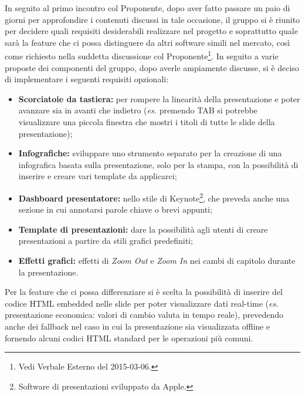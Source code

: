In seguito al primo incontro col Proponente, dopo aver fatto passare un paio di giorni per approfondire i contenuti discussi in tale occasione, il gruppo si è riunito per decidere quali requisiti desiderabili realizzare nel progetto \PROGETTO{} e soprattutto quale sarà la feature che ci possa distinguere da altri software simili nel mercato, così come richiesto nella suddetta discussione col Proponente\footnote{Vedi Verbale Esterno del 2015-03-06.}.
In seguito a varie proposte dei componenti del gruppo, dopo averle ampiamente discusse, si è deciso di implementare i seguenti requisiti opzionali:
\begin{itemize}
	\item \textbf{Scorciatoie da tastiera:} per rompere la linearità della presentazione e poter avanzare sia in avanti che indietro (\textit{es.} premendo TAB si potrebbe visualizzare una piccola finestra che mostri i titoli di tutte le slide della presentazione);
	\item \textbf{Infografiche:} sviluppare uno strumento separato per la creazione di una infografica basata sulla presentazione, solo per la stampa, con la possibilità di inserire e creare vari template da applicarci;
	\item \textbf{Dashboard presentatore:}  nello stile di Keynote\footnote{Software di presentazioni sviluppato da Apple.}, che preveda anche una sezione in cui annotarsi parole chiave o brevi appunti;
	\item \textbf{Template di presentazioni:} dare la possibilità agli utenti di creare presentazioni a partire da stili grafici predefiniti;
	\item \textbf{Effetti grafici:} effetti di \textit{Zoom Out} e \textit{Zoom In} nei cambi di capitolo durante la presentazione.
\end{itemize}

\noindent Per la feature che ci possa differenziare si è scelta la possibilità di inserire del codice HTML embedded nelle slide per poter visualizzare dati real-time (\textit{es.} presentazione economica: valori di cambio valuta in tempo reale), prevedendo anche dei fallback nel caso in cui la presentazione sia visualizzata offline e fornendo alcuni codici HTML standard per le operazioni più comuni.